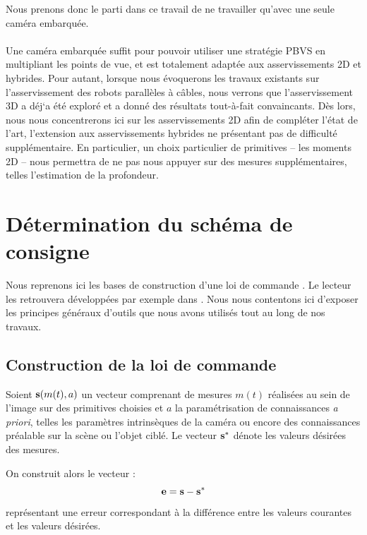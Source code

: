 Nous prenons donc le parti dans ce travail de ne travailler qu'avec une seule 
cam\'era embarqu\'ee.\\

\\

Une cam\'era embarqu\'ee suffit pour pouvoir utiliser une strat\'egie PBVS en 
multipliant les points de vue, et est totalement adapt\'ee aux asservissements 
2D et hybrides. Pour autant, lorsque nous \'evoquerons les travaux existants 
sur l'asservissement des robots parall\`eles \`a c\^ables, nous verrons que 
l'asservissement 3D a d\'ej`a \'et\'e explor\'e et a donn\'e des r\'esultats 
tout-\`a-fait convaincants. D\`es lors, nous nous concentrerons ici sur les 
asservissements 2D afin de compl\'eter l'\'etat de l'art, l'extension aux 
asservissements hybrides ne pr\'esentant pas de difficult\'e suppl\'ementaire. 
En particulier, un choix particulier de primitives -- les moments 2D -- nous 
permettra de ne pas nous appuyer sur des mesures suppl\'ementaires, telles 
l'estimation de la profondeur.

\section{D\'etermination du sch\'ema de consigne}\label{chap1-2}

Nous reprenons ici les bases de construction d'une loi de commande 
\cite{samson1991}. Le lecteur les retrouvera développées par exemple dans 
\cite{chaumette2008handbook}. Nous nous contentons ici d'exposer les principes 
généraux d'outils que nous avons utilisés tout au long de nos travaux.

\subsection{Construction de la loi de commande}

Soient ${\bf s}(m(t), a)$ un vecteur comprenant de mesures $m(t)$ réalisées au 
sein de l'image sur des primitives choisies et $a$ la param\'etrisation de 
connaissances {\it a priori}, telles les param\`etres intrins\`eques de la 
cam\'era ou encore des connaissances pr\'ealable sur la sc\`ene ou l'objet 
cibl\'e. Le vecteur ${\bf s}^*$ d\'enote les valeurs désirées des mesures.

On construit alors le vecteur :
\begin{equation}
{\bf e} = {\bf s} - {\bf s}^*
\label{chap01:eq13}
\end{equation}
représentant une erreur correspondant \`a la différence entre les valeurs 
courantes et les valeurs désirées.

